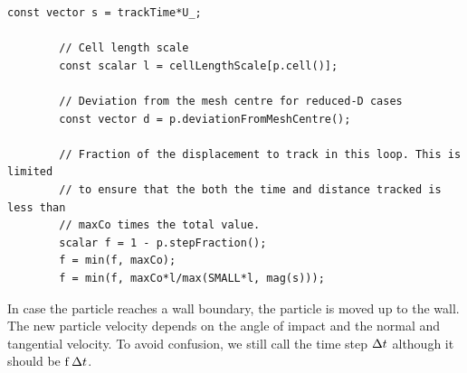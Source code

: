 \ifcode
\begin{lstlisting}[caption = parcels/Templates/KinematicParcel/KinematicParcel.C]
        const vector s = trackTime*U_;

        // Cell length scale
        const scalar l = cellLengthScale[p.cell()];

        // Deviation from the mesh centre for reduced-D cases
        const vector d = p.deviationFromMeshCentre();

        // Fraction of the displacement to track in this loop. This is limited
        // to ensure that the both the time and distance tracked is less than
        // maxCo times the total value.
        scalar f = 1 - p.stepFraction();
        f = min(f, maxCo);
        f = min(f, maxCo*l/max(SMALL*l, mag(s)));

\end{lstlisting}
\fi

In case the particle reaches a wall boundary, the particle is moved up to the wall. The new particle velocity depends on the angle of impact and the normal and tangential velocity.
To avoid confusion, we still call the time step $\Delta t$ although it should be $\operatorname{f} \Delta t$.


